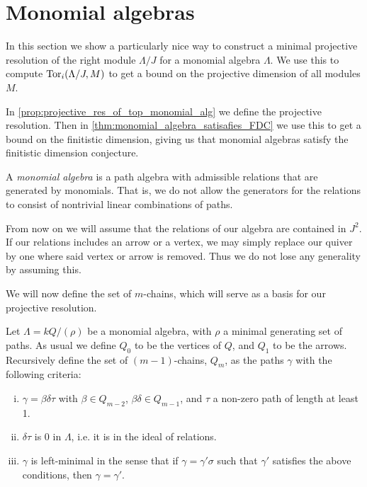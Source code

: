 \section{Monomial algebras}\label{sec:monomial_algebras}

In this section we show a particularly nice way to construct a minimal projective resolution of the right module $\Lambda / J$ for a monomial algebra $\Lambda$. We use this to compute $\operatorname{Tor}_i(\Lambda /J, M)$ to get a bound on the projective dimension of all modules $M$.

In \cref{prop:projective_res_of_top_monomial_alg} we define the projective resolution. Then in \cref{thm:monomial_algebra_satisafies_FDC} we use this to get a bound on the finitistic dimension, giving us that monomial algebras satisfy the finitistic dimension conjecture.

\begin{defn}
	A \emph{monomial algebra} is a path algebra with admissible relations that are generated by monomials. That is, we do not allow the generators for the relations to consist of nontrivial linear combinations of paths.
\end{defn}

From now on we will assume that the relations of our algebra are contained in $J^2$. If our relations includes an arrow or a vertex, we may simply replace our quiver by one where said vertex or arrow is removed. Thus we do not lose any generality by assuming this.

We will now define the set of $m$-chains, which will serve as a basis for our projective resolution.

\begin{defn}[$m$-chains]\cite{GKK91}
	Let $\Lambda = kQ / (\rho)$ be a monomial algebra, with $\rho$ a minimal generating set of paths. As usual we define $Q_0$ to be the vertices of $Q$, and $Q_1$ to be the arrows. Recursively define the set of $(m-1)$-chains, $Q_m$, as the paths $\gamma$ with the following criteria:
	\begin{enumerate}[i)]
		\item $\gamma = \beta\delta\tau$ with $\beta \in Q_{m-2}$, $\beta\delta \in Q_{m-1}$, and $\tau$ a non-zero path of length at least 1.
		\item $\delta\tau$ is 0 in $\Lambda$, i.e. it is in the ideal of relations.
		\item $\gamma$ is left-minimal in the sense that if $\gamma = \gamma' \sigma$ such that $\gamma'$ satisfies the above conditions, then $\gamma = \gamma'$.
	\end{enumerate}
\end{defn}

